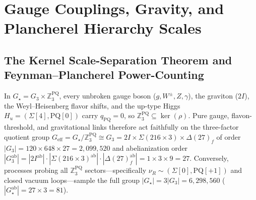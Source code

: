 \documentclass[11pt,a4paper]{article}
\theoremstyle{definition}
\theoremstyle{remark}
\newcommand{\Z}{\mathbb{Z}}
\newcommand{\Gthree}{G_3}
\newcommand{\Gstar}{G_\star}
\begin{document}
\section{Gauge Couplings, Gravity, and Plancherel Hierarchy Scales}
\label{sec:couplings}

\subsection{The Kernel Scale-Separation Theorem and Feynman--Plancherel Power-Counting}

In $\Gstar = \Gthree \times \Z_3^{\mathrm{PQ}}$, every unbroken gauge boson ($g, W^\pm, Z, \gamma$), the graviton ($2I$), the Weyl--Heisenberg flavor shifts, and the up-type Higgs $H_u = (\Sigma[4], \mathrm{PQ}[0])$ carry $q_{\mathrm{PQ}} = 0$, so $\Z_3^{\mathrm{PQ}} \subseteq \ker(\rho)$. Pure gauge, flavon-threshold, and gravitational links therefore act faithfully on the three-factor quotient group $G_{\mathrm{eff}} = \Gstar / \Z_3^{\mathrm{PQ}} \cong \Gthree = 2I \times \Sigma(216 \times 3) \times \Delta(27)_f$ of order $|\Gthree| = 120 \times 648 \times 27 = 2{,}099{,}520$ and abelianization order $|\Gthree^{\mathrm{ab}}| = |2I^{\mathrm{ab}}| \cdot |\Sigma(216 \times 3)^{\mathrm{ab}}| \cdot |\Delta(27)_f^{\mathrm{ab}}| = 1 \times 3 \times 9 = 27$. Conversely, processes probing all $\Z_3^{\mathrm{PQ}}$ sectors---specifically $\nu_R \sim (\Sigma[0], \mathrm{PQ}[+1])$ and closed vacuum loops---sample the full group $|\Gstar| = 3|\Gthree| = 6{,}298{,}560$ ($|\Gstar^{\mathrm{ab}}| = 27 \times 3 = 81$).
\end{document}
